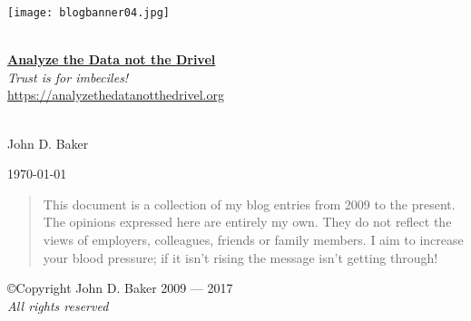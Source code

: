 %

\begin{titlepage}
 
\begin{center}

\texttt{[image: blogbanner04.jpg]}
 
\HRule \\[0.8cm]

{\Huge \href{https://analyzethedatanotthedrivel.org}{\textbf{Analyze the Data not the Drivel}}}\\[0.4cm]

\textsl{Trust is for imbeciles!}\\[0.4cm]

\url{https://analyzethedatanotthedrivel.org}\\[0.4cm]
 
\HRule \\[0.8cm]
 
 
\begin{minipage}{0.45\textwidth}
\begin{flushleft}
{\large John D. Baker} \\
\end{flushleft}
\end{minipage}
\begin{minipage}{0.45\textwidth}
\begin{flushright}
{\large \today} \\
\end{flushright}
\end{minipage}

\vspace{2cm}

\begin{quotation}
This document is a collection of my blog entries from 2009 to the present. The
opinions expressed here are entirely my own.
They do not reflect the views of employers, colleagues, friends or family members.
I aim to increase your blood pressure; if it isn't
rising the message isn't getting through!
\end{quotation}

\vfill

\copyright Copyright John D. Baker 2009 --- 2017 \\
\emph{All rights reserved} \\

 
\end{center}


 
\end{titlepage}

%
